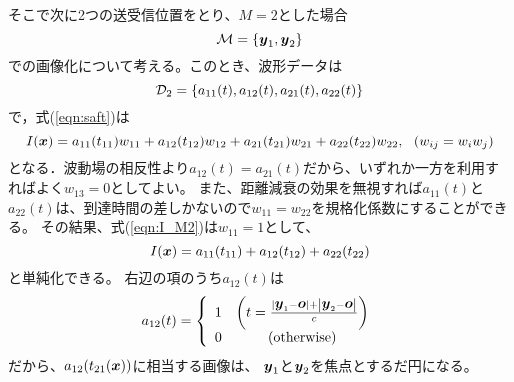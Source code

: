 \documentclass[10pt,a4j,dvipdfmx]{jarticle}
\begin{document}
そこで次に2つの送受信位置をとり、$M=2$とした場合
\begin{equation}
	{\cal M} =\left\{ 
		\mbox{\boldmath $y$}_1, \mbox{\boldmath $y$}_2
	\right\}
	\label{eqn:M2}
\end{equation}
での画像化について考える。このとき、波形データは
\begin{equation}
	{\cal D}_2=\left\{ a_{11}(t), a_{12}(t), a_{21}(t), a_{22}(t)\right\}
	\label{eqn:}
\end{equation}
で，式(\ref{eqn:saft})は
\begin{equation}
	I(\mbox{\boldmath $x$})=a_{11}(t_{11})w_{11}+a_{12}(t_{12})w_{12}+a_{21}(t_{21})w_{21} + a_{22}(t_{22})w_{22}, \ \ (w_{ij}=w_iw_j)
	\label{eqn:I_M2}
\end{equation}
となる．波動場の相反性より$a_{12}(t)=a_{21}(t)$だから、いずれか一方を利用すればよく$w_{13}=0$としてよい。
また、距離減衰の効果を無視すれば$a_{11}(t)$と$a_{22}(t)$は、到達時間の差しかないので$w_{11}=w_{22}$を規格化係数にすることができる。
その結果、式(\ref{eqn:I_M2})は$w_{11}=1$として、
\begin{equation}
	I(\mbox{\boldmath $x$})=a_{11}(t_{11})+a_{12}(t_{12})+ a_{22}(t_{22})
	\label{eqn:I_M2d}
\end{equation}
と単純化できる。
右辺の項のうち$a_{12}(t)$は
\begin{equation}
	a_{12}(t)=\left\{
	\begin{array}{cc}
		1 &  \left( t=\frac{|\mbox{\boldmath $y$}_1-\mbox{\boldmath $o$}|+\left|\mbox{\boldmath $y$}_2-\mbox{\boldmath $o$}\right|}{c}\right)\\
		0 &  ({\rm otherwise})
	\end{array}
	\right.
	\label{eqn:}
\end{equation}
だから、$a_{12}(t_{21}(\mbox{\boldmath $x$}))$に相当する画像は、
$\mbox{\boldmath $y$}_1$と$\mbox{\boldmath $y$}_2$を焦点とするだ円になる。
\end{document}
